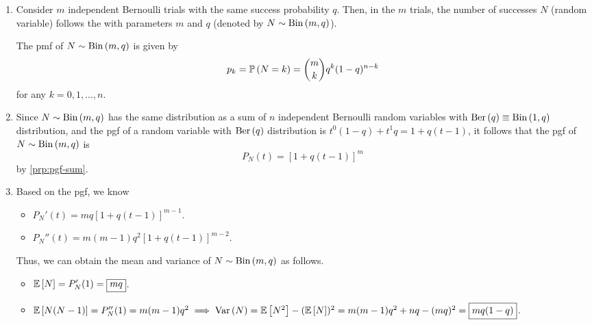\begin{enumerate}
\item Consider \(m\) independent Bernoulli trials with the same success
probability \(q\). Then, in the \(m\) trials, the number of successes \(N\)
(random variable) follows the  with parameters
\(m\) and \(q\) (denoted by \(N\sim\operatorname{Bin}\left(m,q\right)\)).

The pmf of \(N\sim\operatorname{Bin}\left(m,q\right)\) is given by
\[
p_k=\mathbb{P}\left(N=k\right)=\binom{m}{k}q^k(1-q)^{n-k}
\]
for any \(k=0,1,\dotsc,n\).

\item \label{it:bin-pgf}
Since \(N\sim\operatorname{Bin}\left(m,q\right)\) has the same distribution as a sum of \(n\)
independent Bernoulli random variables with \(\operatorname{Ber}\left(q\right)\equiv\operatorname{Bin}\left(1,q\right)\) distribution, and the
pgf of a random variable with \(\operatorname{Ber}\left(q\right)\) distribution is
\(t^0(1-q)+t^1q=1+q(t-1)\), it follows that the pgf of \(N\sim\operatorname{Bin}\left(m,q\right)\) is
\[
P_N(t)=\boxed{[1+q(t-1)]^m}
\]
by \cref{prp:pgf-sum}.

\item \label{it:bin-mean-var}
Based on the pgf, we know
\begin{itemize}
\item \(P_N'(t)=mq[1+q(t-1)]^{m-1}\).
\item \(P_N''(t)=m(m-1)q^2[1+q(t-1)]^{m-2}\).
\end{itemize}

Thus, we can obtain the mean and variance of \(N\sim\operatorname{Bin}\left(m,q\right)\) as follows.
\begin{itemize}
\item \(\mathbb{E}\left[N\right]=P_N'(1)=\boxed{mq}\).
\item \(\mathbb{E}\left[N(N-1)\right]=P_N''(1)=m(m-1)q^2\implies
\operatorname{Var}\left(N\right)=\mathbb{E}\left[N^2\right]-(\mathbb{E}\left[N\right])^2
=m(m-1)q^2+nq-(mq)^2
=\boxed{mq(1-q)}\).
\end{itemize}
\end{enumerate}
